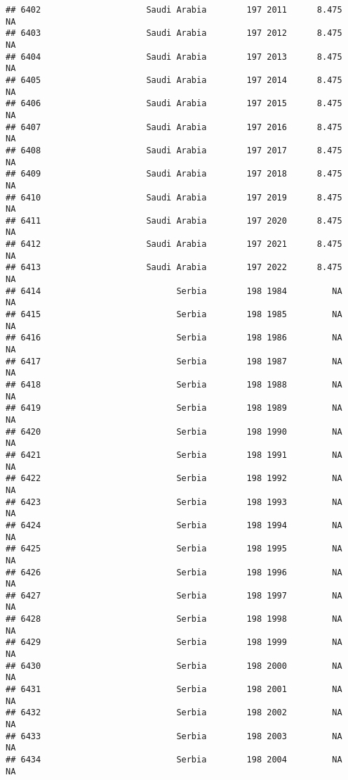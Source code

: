 \documentclass[
]{article}
\begin{document}
\begin{verbatim}
## 6402                     Saudi Arabia        197 2011      8.475         NA
## 6403                     Saudi Arabia        197 2012      8.475         NA
## 6404                     Saudi Arabia        197 2013      8.475         NA
## 6405                     Saudi Arabia        197 2014      8.475         NA
## 6406                     Saudi Arabia        197 2015      8.475         NA
## 6407                     Saudi Arabia        197 2016      8.475         NA
## 6408                     Saudi Arabia        197 2017      8.475         NA
## 6409                     Saudi Arabia        197 2018      8.475         NA
## 6410                     Saudi Arabia        197 2019      8.475         NA
## 6411                     Saudi Arabia        197 2020      8.475         NA
## 6412                     Saudi Arabia        197 2021      8.475         NA
## 6413                     Saudi Arabia        197 2022      8.475         NA
## 6414                           Serbia        198 1984         NA         NA
## 6415                           Serbia        198 1985         NA         NA
## 6416                           Serbia        198 1986         NA         NA
## 6417                           Serbia        198 1987         NA         NA
## 6418                           Serbia        198 1988         NA         NA
## 6419                           Serbia        198 1989         NA         NA
## 6420                           Serbia        198 1990         NA         NA
## 6421                           Serbia        198 1991         NA         NA
## 6422                           Serbia        198 1992         NA         NA
## 6423                           Serbia        198 1993         NA         NA
## 6424                           Serbia        198 1994         NA         NA
## 6425                           Serbia        198 1995         NA         NA
## 6426                           Serbia        198 1996         NA         NA
## 6427                           Serbia        198 1997         NA         NA
## 6428                           Serbia        198 1998         NA         NA
## 6429                           Serbia        198 1999         NA         NA
## 6430                           Serbia        198 2000         NA         NA
## 6431                           Serbia        198 2001         NA         NA
## 6432                           Serbia        198 2002         NA         NA
## 6433                           Serbia        198 2003         NA         NA
## 6434                           Serbia        198 2004         NA         NA

\end{verbatim}
\end{document}
